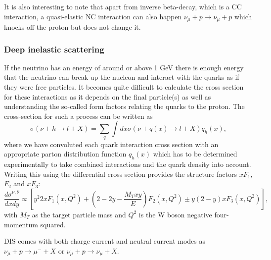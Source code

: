 It is also interesting to note that apart from inverse beta-decay, which is a CC interaction, a quasi-elastic NC interaction can also happen $\nu_\mu + p \rightarrow \nu_\mu + p$ which knocks off the proton but does not change it.


\subsubsection{Deep inelastic scattering}
If the neutrino has an energy of around or above 1 GeV there is enough energy that the neutrino can break up the nucleon and interact with the quarks as if they were free particles. It becomes quite difficult to calculate the cross section for these interactions as it depends on the final particle(s) as well as understanding the so-called form factors relating the quarks to the proton. The cross-section for such a process can be written as
\begin{equation}
 \sigma( \nu + h \rightarrow l + X) = \sum_q \int dx \sigma ( \nu + q(x) \rightarrow l + X) q_h (x),
\end{equation}
where we have convoluted each quark interaction cross section with an appropriate parton distribution function $q_h(x)$ which has to be determined experimentally to take combined interactions and the quark density into account. Writing this using the differential cross section provides the structure factors $xF_1$, $F_2$ and $xF_3$:
\begin{equation}
\frac{d\sigma^{\nu,\bar{\nu}}}{dxdy}\propto \left[ y^2 2xF_1 (x,Q^2) + (2-2y-\frac{M_T xy}{E})F_2 (x,Q^2)\pm y(2-y)xF_3 (x,Q^2)\right],
\end{equation}
 with $M_T$ as the target particle mass and $Q^2$ is the W boson negative four-momentum squared.

DIS comes with both charge current and neutral current modes as $\nu_\mu + p \rightarrow \mu^- + X$ or $\nu_\mu + p \rightarrow \nu_\mu + X$.

